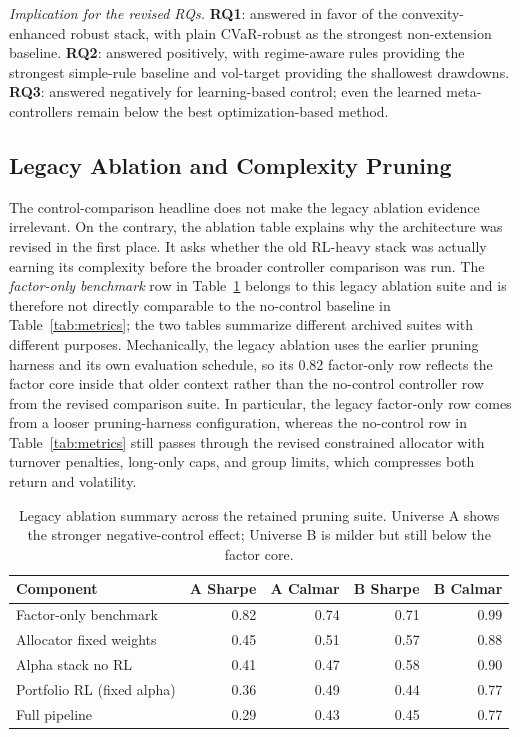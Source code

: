 \documentclass[10pt,twocolumn]{article}
\begin{document}
\noindent\textit{Implication for the revised RQs.} \textbf{RQ1}: answered in
favor of the convexity-enhanced robust stack, with plain CVaR-robust as the
strongest non-extension baseline. \textbf{RQ2}: answered positively, with
regime-aware rules providing the strongest simple-rule baseline and vol-target
providing the shallowest drawdowns. \textbf{RQ3}: answered negatively for
learning-based control; even the learned meta-controllers remain below the best
optimization-based method.

\subsection{Legacy Ablation and Complexity Pruning}

The control-comparison headline does not make the legacy ablation evidence
irrelevant. On the contrary, the ablation table explains why the architecture
was revised in the first place. It asks whether the old RL-heavy stack was
actually earning its complexity before the broader controller comparison was
run. The \emph{factor-only benchmark} row in Table~\ref{tab:ablation_summary}
belongs to this legacy ablation suite and is therefore not directly comparable
to the no-control baseline in Table~\ref{tab:metrics}; the two tables summarize
different archived suites with different purposes. Mechanically, the legacy
ablation uses the earlier pruning harness and its own evaluation schedule, so
its 0.82 factor-only row reflects the factor core inside that older context
rather than the no-control controller row from the revised comparison suite.
In particular, the legacy factor-only row comes from a looser pruning-harness
configuration, whereas the no-control row in Table~\ref{tab:metrics} still
passes through the revised constrained allocator with turnover penalties,
long-only caps, and group limits, which compresses both return and volatility.

\begin{table}[t]
\centering
\caption{Legacy ablation summary across the retained pruning suite. Universe A
shows the stronger negative-control effect; Universe B is milder but still
below the factor core.}
\label{tab:ablation_summary}
\begingroup\small
\begin{tabular}{@{} l r r r r @{}}
\toprule
\textbf{Component} & \textbf{A Sharpe} & \textbf{A Calmar} & \textbf{B Sharpe} & \textbf{B Calmar} \\
\midrule
Factor-only benchmark       & 0.82 & 0.74 & 0.71 & 0.99 \\
Allocator fixed weights     & 0.45 & 0.51 & 0.57 & 0.88 \\
Alpha stack no RL           & 0.41 & 0.47 & 0.58 & 0.90 \\
Portfolio RL (fixed alpha)  & 0.36 & 0.49 & 0.44 & 0.77 \\
Full pipeline               & 0.29 & 0.43 & 0.45 & 0.77 \\
\bottomrule
\end{tabular}
\endgroup
\end{table}
\end{document}

